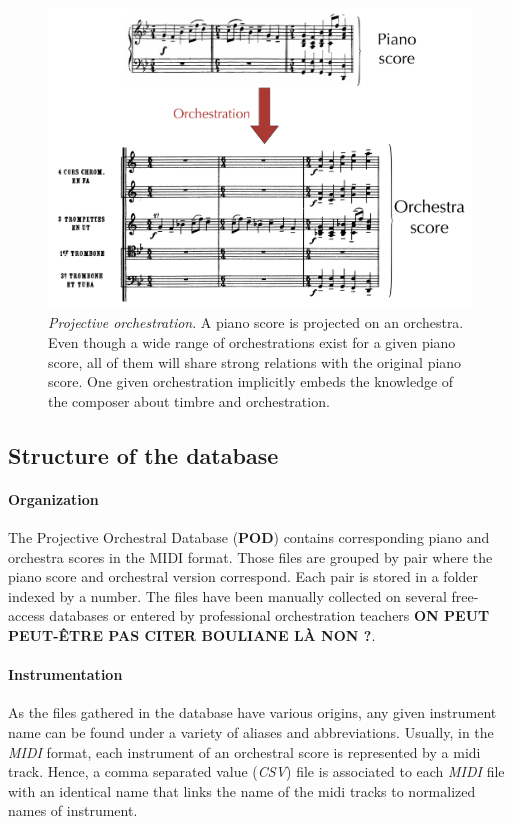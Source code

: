 \documentclass[twoside,twocolumn]{article}
\begin{document}
\begin{figure}
\centering
\includegraphics[scale=0.14]{Data_representation/orch}
\caption{\textit{Projective orchestration}. A piano score is projected on an orchestra. Even though a wide range of orchestrations exist for a given piano score, all of them will share strong relations with the original piano score. One given orchestration implicitly embeds the knowledge of the composer about timbre and orchestration.}
\label{fig:orch}
\end{figure}

\subsection{Structure of the database}
\paragraph{Organization}
The Projective Orchestral Database (\textbf{POD}) contains corresponding piano and orchestra scores in the MIDI format.
Those files are grouped by pair where the piano score and orchestral version correspond.
Each pair is stored in a folder indexed by a number.
The files have been manually collected on several free-access databases \cite{imslp} or entered by professional orchestration teachers \textbf{ON PEUT PEUT-ÊTRE PAS CITER BOULIANE LÀ NON ?}.

\paragraph{Instrumentation}
As the files gathered in the database have various origins, any given instrument name can be found under a variety of aliases and abbreviations. 
Usually, in the \textit{MIDI} format, each instrument of an orchestral score is represented by a midi track.
Hence, a comma separated value (\textit{CSV}) file is associated to each \textit{MIDI} file with an identical name that links the name of the midi tracks to normalized names of instrument.
\end{document}
